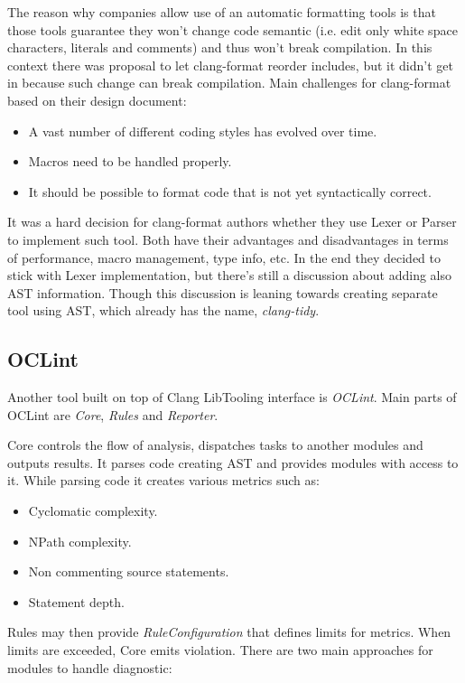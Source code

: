 The reason why companies allow use of an automatic formatting tools is that those tools guarantee they won't change code semantic (i.e. edit only white space characters, literals and comments) and thus won't break compilation. In this context there was proposal to let clang-format reorder includes, but it didn't get in because such change can break compilation. Main challenges for clang-format based on their design document:

\begin{itemize}
\item A vast number of different coding styles has evolved over time.
\item Macros need to be handled properly.
\item It should be possible to format code that is not yet syntactically correct.
\end{itemize}

It was a hard decision for clang-format authors whether they use Lexer or Parser to implement such tool. Both have their advantages and disadvantages in terms of performance, macro management, type info, etc. In the end they decided to stick with Lexer implementation, but there's still a discussion about adding also AST information. Though this discussion is leaning towards creating separate tool using AST, which already has the name, \emph{clang-tidy}.

\subsection{OCLint}
Another tool built on top of Clang LibTooling interface is \emph{OCLint}. Main parts of OCLint are \emph{Core}, \emph{Rules} and \emph{Reporter}.

Core controls the flow of analysis, dispatches tasks to another modules and outputs results. It parses code creating AST and provides modules with access to it. While parsing code it creates various metrics such as:

\begin{itemize}
\item Cyclomatic complexity.
\item NPath complexity.
\item Non commenting source statements.
\item Statement depth.
\end{itemize}

Rules may then provide \emph{RuleConfiguration} that defines limits for metrics. When limits  are exceeded, Core emits violation. There are two main approaches for modules to handle diagnostic:

